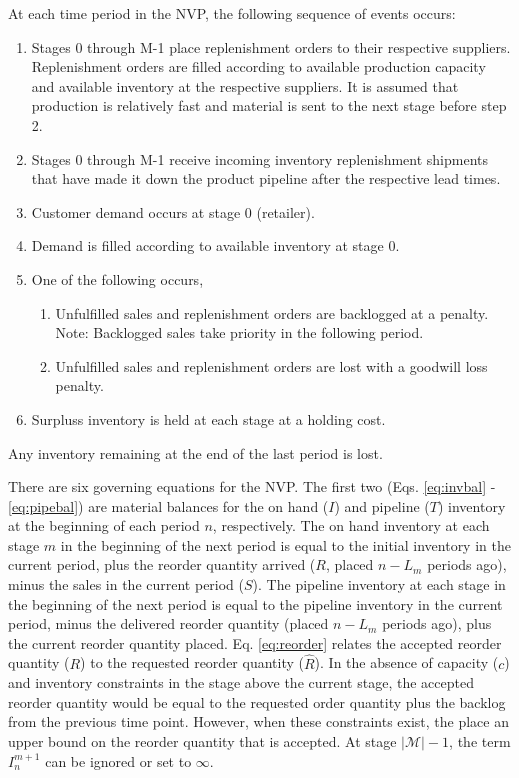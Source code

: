 \documentclass[12pt]{article}
\begin{document}
At each time period in the NVP, the following sequence of events occurs:
\begin{enumerate}
    \item Stages 0 through M-1 place replenishment orders to their respective suppliers. Replenishment orders are filled
        according to available production capacity and available inventory at the respective suppliers. It is assumed that production is relatively fast and material is sent to the next stage before step 2.
    \item Stages 0 through M-1 receive incoming inventory replenishment shipments that have made it down the product pipeline
        after the respective lead times.
    \item Customer demand occurs at stage 0 (retailer).
    \item Demand is filled according to available inventory at stage 0.
    \item One of the following occurs,
        \begin{enumerate}
            \item Unfulfilled sales and replenishment orders are backlogged at a penalty. 
            Note: Backlogged sales take priority in the following period.
            \item Unfulfilled sales and replenishment orders are lost with a goodwill loss penalty.
        \end{enumerate}
    \item Surpluss inventory is held at each stage at a holding cost.
\end{enumerate}

Any inventory remaining at the end of the last period is lost.

There are six governing equations for the NVP. The first two (Eqs. \ref{eq:invbal} - \ref{eq:pipebal}) are material balances for the on hand ($I$) and pipeline ($T$) inventory at the beginning of each period $n$, respectively. The on hand inventory at each stage $m$ in the beginning of the next period is equal to the initial inventory in the current period, plus the reorder quantity arrived ($R$, placed $n-L_m$ periods ago), minus the sales in the current period ($S$). The pipeline inventory at each stage in the beginning of the next period is equal to the pipeline inventory in the current period, minus the delivered reorder quantity (placed $n-L_m$ periods ago), plus the current reorder quantity placed. Eq. \ref{eq:reorder} relates the accepted reorder quantity ($R$) to the requested reorder quantity ($\hat{R}$). In the absence of capacity ($c$) and inventory constraints in the stage above the current stage, the accepted reorder quantity would be equal to the requested order quantity plus the backlog from the previous time point. However, when these constraints exist, the place an upper bound on the reorder quantity that is accepted. At stage $|\mathcal{M}|-1$, the term $I^{m+1}_n$ can be ignored or set to $\infty$. 
\end{document}
